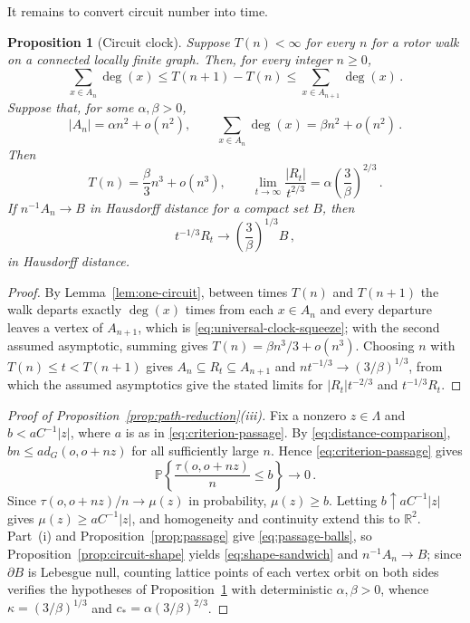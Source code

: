 \documentclass[11pt]{amsart}
\theoremstyle{plain}
\newtheorem{proposition}[theorem]{Proposition}
\theoremstyle{definition}
\newcommand{\R}{\mathbb R}
\renewcommand{\P}{\mathbb P}
\begin{document}
	It remains to convert circuit number into time.
	
	\begin{proposition}[Circuit clock]
		\label{prop:circuit-clock}
		Suppose $T(n)<\infty$ for every $n$ for a rotor walk on a connected locally
		finite graph.  Then, for every integer $n\geq0$,
		\begin{equation}\label{eq:universal-clock-squeeze}
			\sum_{x\in A_n}\deg(x)
			\leq T(n+1)-T(n)
			\leq\sum_{x\in A_{n+1}}\deg(x)\, .
		\end{equation}
		Suppose that, for some $\alpha,\beta>0$,
		\[
		|A_n|=\alpha n^2+o(n^2),
		\qquad
		\sum_{x\in A_n}\deg(x)=\beta n^2+o(n^2)\, .
		\]
		Then
		\[
		T(n)=\frac \beta3n^3+o(n^3),
		\qquad
		\lim_{t\to\infty}\frac{|R_t|}{t^{2/3}}
		=\alpha\left(\frac3\beta\right)^{2/3}\, .
		\]
		If
		$n^{-1}A_n\to B$ in Hausdorff distance for a compact set $B$, then
		\[
		t^{-1/3}R_t\longrightarrow\left(\frac3\beta\right)^{1/3}B\, ,
		\]
		in Hausdorff distance.
	\end{proposition}
	
	\begin{proof}
		By Lemma~\ref{lem:one-circuit}, between times $T(n)$ and $T(n+1)$ the walk
		departs exactly $\deg(x)$ times from each $x\in A_n$ and every departure
		leaves a vertex of $A_{n+1}$, which is \eqref{eq:universal-clock-squeeze};
		with the second assumed asymptotic, summing gives
		$T(n)=\beta n^3/3+o(n^3)$.  Choosing $n$ with $T(n)\leq t<T(n+1)$ gives
		$A_n\subseteq R_t\subseteq A_{n+1}$ and $nt^{-1/3}\to(3/\beta)^{1/3}$, from
		which the assumed asymptotics give the stated limits for $|R_t|t^{-2/3}$
		and $t^{-1/3}R_t$.
	\end{proof}
	
	\begin{proof}[Proof of Proposition~\ref{prop:path-reduction}\textup{(iii)}]
		Fix a nonzero $z\in\Lambda$ and $b<aC^{-1}|z|$, where $a$ is as in
		\eqref{eq:criterion-passage}.  By \eqref{eq:distance-comparison},
		$bn\leq a d_G(o,o+nz)$ for all sufficiently large $n$.  Hence
		\eqref{eq:criterion-passage} gives
		\[
			\P\left\{\frac{\tau(o,o+nz)}n\leq b\right\}\longrightarrow0\, .
		\]
		Since $\tau(o,o+nz)/n\to\mu(z)$ in probability, $\mu(z)\geq b$.
		Letting $b\uparrow aC^{-1}|z|$ gives
		$\mu(z)\geq aC^{-1}|z|$, and homogeneity and continuity extend this to
		$\R^2$.  Part~\textup{(i)} and
		Proposition~\ref{prop:passage} give \eqref{eq:passage-balls}, so
		Proposition~\ref{prop:circuit-shape} yields \eqref{eq:shape-sandwich} and
		$n^{-1}A_n\to B$; since $\partial B$ is Lebesgue null, counting lattice
		points of each vertex orbit on both sides verifies the hypotheses of
		Proposition~\ref{prop:circuit-clock} with deterministic $\alpha,\beta>0$,
		whence $\kappa=(3/\beta)^{1/3}$ and $c_*=\alpha(3/\beta)^{2/3}$.
	\end{proof}
	
\end{document}
